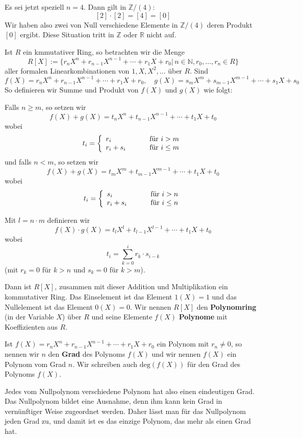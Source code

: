 \begin{beispiel} Es sei jetzt speziell $n = 4$. Dann gilt in $\mathbb Z/ (4)$:
  	$$ [2] \cdot [2] = [4] = [0] $$
Wir haben also zwei von Null verschiedene Elemente in $\mathbb Z/ (4)$ deren Produkt $[0]$ ergibt. Diese 
Situation tritt in $\mathbb Z$ oder $\mathbb R$ nicht auf.
\end{beispiel}

\begin{beispiel}  Ist $R$ ein kmmutativer Ring, so betrachten wir die Menge
  	$$ R[X] := \{ r_n X^n + r_{n-1} X^{n-1} + \cdots + r_1 X + r_0 \vert \, n \in \mathbb N, r_0, \ldots, r_n \in R \} $$
aller formalen Linearkombinationen von $1, X, X^2, \ldots$ über $R$. Sind
  	$$ f(X) =  r_n X^n + r_{n-1} X^{n-1} + \cdots + r_1 X + r_0, \quad 
	g(X) =  s_m X^m + s_{m-1} X^{m-1} + \cdots + s_1 X + s_0 $$
So definieren wir Summe und Produkt von $f(X)$ und $g(X)$ wie folgt:

Falls $n \geq m$, so setzen wir 
  	$$ f(X) + g(X) = t_n X^n + t_{n-1} X^{n-1} + \cdots + t_1 X + t_0 $$
wobei 
  	$$ t_i = \left\{ \begin{array}{l c l} r_i & \quad & \textrm{ für } i > m \\ r_i + s_i & & 
	\textrm{ für } i \leq m \end{array} \right. $$
und falls $n < m$, so setzen wir 
  	$$ f(X) + g(X) = t_m X^m + t_{m-1} X^{m-1} + \cdots + t_1 X + t_0 $$
wobei 
  	$$ t_i = \left\{ \begin{array}{l c l} s_i & \quad & \textrm{ für } i > n \\ r_i + s_i & & 
	\textrm{ für } i \leq n \end{array} \right. $$

Mit $l = n \cdot m$ definieren wir 
  	$$ f(X) \cdot g(X) =  t_l X^l + t_{l-1} X^{l-1} + \cdots + t_1 X + t_0 $$
wobei
  	$$ t_i = \sum\limits_{k = 0}^{i} r_k \cdot s_{i-k} $$
(mit $r_k = 0$ für $k > n$ und $s_k = 0$ für $k > m$).

Dann ist $R[X]$, zusammen mit dieser Addition und Multiplikation ein kommutativer Ring. Das Einselement ist 
das Element $1(X) = 1$ und das Nullelement ist das Element $0(X) = 0$. Wir nennen $R[X]$ den 
\textbf{Polynomring} (in der Variable $X$) über $R$ und seine Elemente $f(X)$ 
\textbf{Polynome} mit Koeffizienten aus $R$. 

Ist $ f(X) =  r_n X^n + r_{n-1} X^{n-1} + \cdots + r_1 X + r_0$ ein Polynom mit $r_n \neq 0$, so nennen wir 
$n$ den \textbf{Grad} des Polynoms $f(X)$ und wir nennen $f(X)$ ein Polynom vom 
Grad $n$. Wir schreiben auch $\textrm{deg}(f(X))$ für den Grad des Polynoms $f(X)$.

Jedes vom Nullpolynom verschiedene Polynom hat also einen eindeutigen Grad. Das Nullpolynom bildet eine 
Ausnahme, denn ihm kann kein Grad in vernünftiger Weise zugeordnet werden. Daher lässt man für das 
Nullpolynom jeden Grad zu, und damit ist es das einzige Polynom, das mehr als einen Grad hat.
\end{beispiel}

